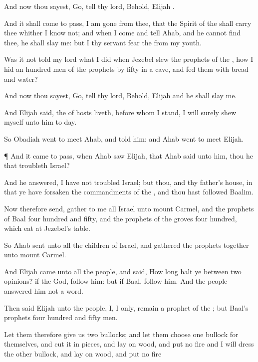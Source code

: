 {And now thou
sayest,
Go,
tell thy
lord, Behold,
Elijah
{}.

And it shall come to pass,
{} I am
gone from thee, that the
Spirit of the
{} shall
carry thee whither I
know not; and
{} when I
come and
tell
Ahab, and he cannot
find thee, he shall
slay me: but I thy
servant
fear the
{} from my
youth.

Was it not
told my
lord what I
did when
Jezebel
slew the
prophets of the
{}, how I
hid an
hundred
men of the
{}
prophets by
fifty in a
cave, and
fed them with
bread and
water?

And now thou
sayest,
Go,
tell thy
lord, Behold,
Elijah
{} and he shall
slay me.

And
Elijah
said,
{} the
{} of
hosts
liveth,
before whom I
stand, I will surely
shew myself unto him to
day.

So
Obadiah
went to
meet
Ahab, and
told him: and
Ahab
went to
meet
Elijah.


\par }{\PP {}¶ And it came to pass, when
Ahab
saw
Elijah, that
Ahab
said unto him,
{} thou he that
troubleth
Israel?

And he
answered, I have not
troubled
Israel; but thou, and thy
father’s
house, in that ye have
forsaken the
commandments of the
{}, and thou hast
followed
Baalim.

Now therefore
send,
{}
gather to me all
Israel unto
mount
Carmel, and the
prophets of
Baal
four
hundred and
fifty, and the
prophets of the
groves
four
hundred, which
eat at
Jezebel’s
table.

So
Ahab
sent unto all the
children of
Israel, and
gathered the
prophets
together unto
mount
Carmel.


\par }{\PP {}And
Elijah
came unto all the
people, and
said, How
long
halt ye between
two
opinions? if the
{}
{}
God, follow him: but if
Baal,
{}
follow him. And the
people
answered him not a
word.

Then
said
Elijah unto the
people, I,
{} I only,
remain a
prophet of the
{}; but
Baal’s
prophets
{}
four
hundred and
fifty
men.

Let them therefore
give us
two
bullocks; and let them
choose
one
bullock for themselves, and cut it in
pieces, and
lay
{} on
wood, and
put no
fire
{} and I will
dress the
other
bullock, and
lay
{} on
wood, and
put no
fire
{}

}
